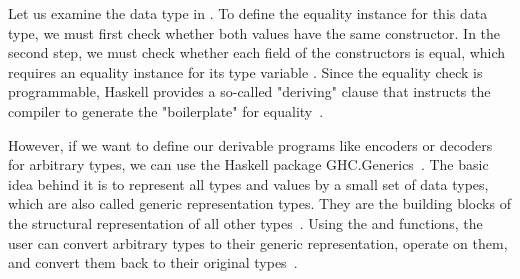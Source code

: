 \begin{frame}
    Let us examine the data type   in . 
    To define the equality instance for this data type, we must first check whether both values have the same constructor. In the second step, we must check whether each field of the constructors is equal, which requires an equality instance for its type variable . Since the equality check is programmable, Haskell provides a so-called "deriving" clause that instructs the compiler to generate the "boilerplate" for equality~\cite{derivable-type-classes, meta-hs}. 
    
    
    However, if we want to define our derivable programs like encoders or decoders for arbitrary types, we can use the Haskell package GHC.Generics~\cite{ghc-generics}. The basic idea behind it is to represent all types and values by a small set of data types, which are also called generic representation types. They are the building blocks of the structural representation of all other types~\cite{optimizing-generics}.
    Using the  and  functions, the user can convert arbitrary types to their generic representation, operate on them, and convert them back to their original types~\cite{optimizing-generics,history-of-haskell, ghc-generics}.

\end{frame}


